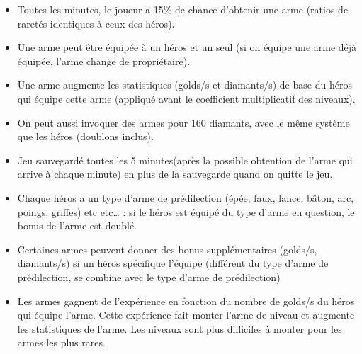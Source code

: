 \begin{itemize}
\begin{itemize}
                \item Toutes les minutes, le joueur a 15\% de chance d’obtenir une arme (ratios de raretés identiques à ceux des héros).

                \item Une arme peut être équipée à un héros et un seul (si on équipe une arme déjà équipée, l’arme change de propriétaire).

                \item Une arme augmente les statistiques (golds/s et diamants/s) de base du héros qui équipe cette arme (appliqué avant le coefficient multiplicatif des niveaux).

                \item On peut aussi invoquer des armes pour 160 diamants, avec le même système que les héros (doublons inclus).

                \item Jeu sauvegardé toutes les 5 minutes(après la possible obtention de l’arme qui arrive à chaque minute) en plus de la sauvegarde quand on quitte le jeu.

                \item Chaque héros a un type d’arme de prédilection (épée, faux, lance, bâton, arc, poings, griffes) etc etc… : si le héros est équipé du type d’arme en question, le bonus de l’arme est doublé.

                \item Certaines armes peuvent donner des bonus supplémentaires (golds/s, diamants/s) si un héros spécifique l’équipe (différent du type d’arme de prédilection, se combine avec le type d’arme de prédilection)

                \item Les armes gagnent de l’expérience en fonction du nombre de golds/s du héros qui équipe l’arme. Cette expérience fait monter l’arme de niveau et augmente les statistiques de l’arme. Les niveaux sont plus difficiles à monter pour les armes les plus rares.

            \end{itemize}



        \end{itemize}
